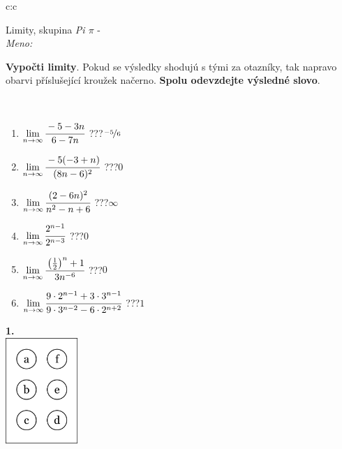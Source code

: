 \documentclass[10pt]{report}
\begin{document}
\begin{tabular}{c:c}
\begin{minipage}[c][104.5mm][t]{0.5\linewidth}
\begin{center}
\vspace{7mm}
{\huge Limity, skupina \textit{Pi $\pi$} -}\\[5mm]
\textit{Meno:}\phantom{xxxxxxxxxxxxxxxxxxxxxxxxxxxxxxxxxxxxxxxxxxxxxxxxxxxxxxxxxxxxxxxxx}\\[5mm]
\begin{minipage}{0.95\linewidth}
\begin{center}
\textbf{Vypočti limity}. Pokud se výsledky shodujú s tými za otazníky, tak napravo\\obarvi příslušející kroužek načerno. \textbf{Spolu odevzdejte výsledné slovo}.
\end{center}
\end{minipage}
\\[1mm]
\begin{minipage}{0.79\linewidth}
\begin{center}
\begin{varwidth}{\linewidth}
\begin{enumerate}
\normalsize
\item $\lim\limits_{n\to\infty}\cfrac{-5-3n}{6-7n}$\quad \dotfill\; ???\;\dotfill \quad $\nicefrac{-5}{6}$
\item $\lim\limits_{n\to\infty}\cfrac{-5(-3+n)}{(8n-6)^2}$\quad \dotfill\; ???\;\dotfill \quad $0$
\item $\lim\limits_{n\to\infty}\cfrac{(2-6n)^2}{n^2-n+6}$\quad \dotfill\; ???\;\dotfill \quad $\infty$
\item $\lim\limits_{n\to\infty}\cfrac{2^{n-1}}{2^{n-3}}$\quad \dotfill\; ???\;\dotfill \quad $0$
\item $\lim\limits_{n\to\infty}\cfrac{\left(\frac{1}{2}\right)^n +1}{3n^{-6}}$\quad \dotfill\; ???\;\dotfill \quad $0$
\item $\lim\limits_{n\to\infty}\cfrac{9\cdot 2^{n-1}+3\cdot 3^{n-1}}{9\cdot 3^{n-2}-6\cdot 2^{n+2}}$\quad \dotfill\; ???\;\dotfill \quad $1$
\end{enumerate}
\end{varwidth}
\end{center}
\end{minipage}
\begin{minipage}{0.20\linewidth}
\begin{center}
{\Huge\bfseries 1.} \\[2mm]
\includegraphics[height=40mm]{../images/braille.png}

\end{center}
\end{minipage}
\end{center}
\end{minipage}
\end{tabular}
\end{document}
